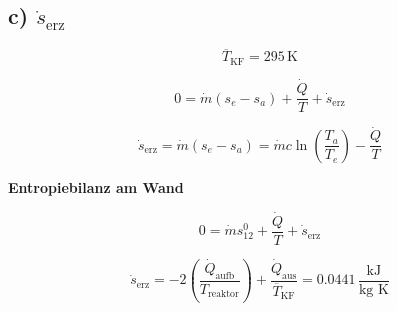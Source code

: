 \subsection*{c) $\dot{s}_{\text{erz}}$}

\[
\overline{T}_{\text{KF}} = 295 \, \text{K}
\]

\[
0 = \dot{m} \left( s_e - s_a \right) + \frac{\dot{Q}}{T} + \dot{s}_{\text{erz}}
\]

\[
\dot{s}_{\text{erz}} = \dot{m} \left( s_e - s_a \right) = \dot{m} c \ln \left( \frac{T_a}{T_e} \right) - \frac{\dot{Q}}{T}
\]

\textbf{Entropiebilanz am Wand}

\[
0 = \dot{m} s^0_{12} + \frac{\dot{Q}}{T} + \dot{s}_{\text{erz}}
\]

\[
\dot{s}_{\text{erz}} = -2 \left( \frac{\dot{Q}_{\text{aufb}}}{T_{\text{reaktor}}} \right) + \frac{\dot{Q}_{\text{aus}}}{\overline{T}_{\text{KF}}} = 0.0441 \, \frac{\text{kJ}}{\text{kg K}}
\]